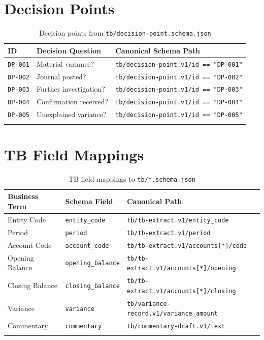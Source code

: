 \documentclass[11pt,a4paper]{report}
\newcommand{\schemapath}[1]{\texttt{\textcolor{pathcolor}{#1}}}
\newcommand{\enumval}[1]{\texttt{\textcolor{sapgreen}{#1}}}
\newcommand{\fieldref}[1]{\texttt{\textcolor{sapblue}{#1}}}
\begin{document}
\section{Decision Points}

\begin{longtable}{@{}p{2cm}p{4cm}p{6cm}@{}}
\toprule
\textbf{ID} & \textbf{Decision Question} & \textbf{Canonical Schema Path} \\
\midrule
\endhead
\enumval{DP-001} & Material variance? & \schemapath{tb/decision-point.v1/id == "DP-001"} \\
\enumval{DP-002} & Journal posted? & \schemapath{tb/decision-point.v1/id == "DP-002"} \\
\enumval{DP-003} & Further investigation? & \schemapath{tb/decision-point.v1/id == "DP-003"} \\
\enumval{DP-004} & Confirmation received? & \schemapath{tb/decision-point.v1/id == "DP-004"} \\
\enumval{DP-005} & Unexplained variance? & \schemapath{tb/decision-point.v1/id == "DP-005"} \\
\bottomrule
\caption{Decision points from \schemapath{tb/decision-point.schema.json}}
\end{longtable}

\section{TB Field Mappings}

\begin{longtable}{@{}p{3cm}p{4cm}p{5cm}@{}}
\toprule
\textbf{Business Term} & \textbf{Schema Field} & \textbf{Canonical Path} \\
\midrule
\endhead
Entity Code & \fieldref{entity\_code} & \schemapath{tb/tb-extract.v1/entity\_code} \\
Period & \fieldref{period} & \schemapath{tb/tb-extract.v1/period} \\
Account Code & \fieldref{account\_code} & \schemapath{tb/tb-extract.v1/accounts[*]/code} \\
Opening Balance & \fieldref{opening\_balance} & \schemapath{tb/tb-extract.v1/accounts[*]/opening} \\
Closing Balance & \fieldref{closing\_balance} & \schemapath{tb/tb-extract.v1/accounts[*]/closing} \\
Variance & \fieldref{variance} & \schemapath{tb/variance-record.v1/variance\_amount} \\
Commentary & \fieldref{commentary} & \schemapath{tb/commentary-draft.v1/text} \\
\bottomrule
\caption{TB field mappings to \schemapath{tb/*.schema.json}}
\end{longtable}
\end{document}
